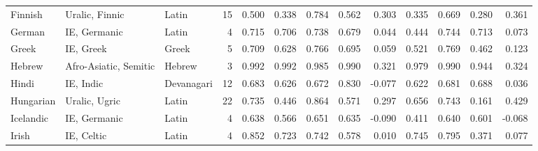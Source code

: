 \begin{tabular}{lllrrrrrrrrrr}
                Finnish &                  Uralic, Finnic &      Latin &        15 &                       0.500 &                         0.338 &         0.784 &                  0.562 &            0.303 &                         0.335 &         0.669 &                  0.280 &            0.361 \\
                 German &                    IE, Germanic &      Latin &         4 &                       0.715 &                         0.706 &         0.738 &                  0.679 &            0.044 &                         0.444 &         0.744 &                  0.713 &            0.073 \\
                  Greek &                       IE, Greek &      Greek &         5 &                       0.709 &                         0.628 &         0.766 &                  0.695 &            0.059 &                         0.521 &         0.769 &                  0.462 &            0.123 \\
                 Hebrew &           Afro-Asiatic, Semitic &     Hebrew &         3 &                       0.992 &                         0.992 &         0.985 &                  0.990 &            0.321 &                         0.979 &         0.990 &                  0.944 &            0.324 \\
                  Hindi &                       IE, Indic & Devanagari &        12 &                       0.683 &                         0.626 &         0.672 &                  0.830 &           -0.077 &                         0.622 &         0.681 &                  0.688 &            0.036 \\
              Hungarian &                   Uralic, Ugric &      Latin &        22 &                       0.735 &                         0.446 &         0.864 &                  0.571 &            0.297 &                         0.656 &         0.743 &                  0.161 &            0.429 \\
              Icelandic &                    IE, Germanic &      Latin &         4 &                       0.638 &                         0.566 &         0.651 &                  0.635 &           -0.090 &                         0.411 &         0.640 &                  0.601 &           -0.068 \\
                  Irish &                      IE, Celtic &      Latin &         4 &                       0.852 &                         0.723 &         0.742 &                  0.578 &            0.010 &                         0.745 &         0.795 &                  0.371 &            0.077 \\

\end{tabular}
